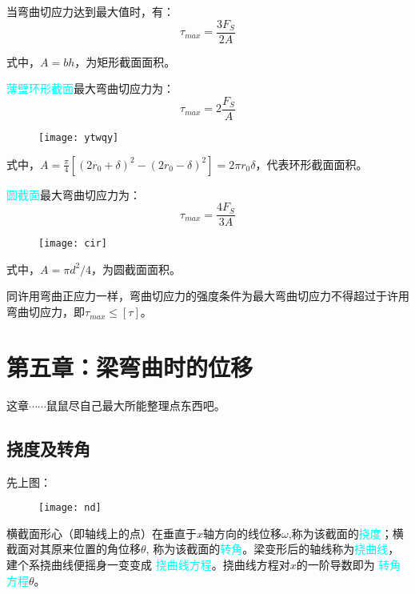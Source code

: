 \documentclass[10pt,a4paper]{ctexart}
\begin{document}
当弯曲切应力达到最大值时，有：
\begin{equation}
	\tau_{max}=\frac{3F_S}{2A}
\end{equation}

式中，$A=bh$，为矩形截面面积。

\textcolor{cyan}{薄壁环形截面}最大弯曲切应力为：
\begin{equation}
		\tau_{max}=2 \frac{F_S}{A}
\end{equation}

\begin{figure}[htp]%
	\centering
	\texttt{[image: ytwqy]}
\end{figure}

式中，$A=\frac{\pi}{4}\left[(2r_0+\delta)^2-(2r_0-\delta)^2\right]=2\pi r_0\delta$，代表环形截面面积。

\textcolor{cyan}{圆截面}最大弯曲切应力为：
\begin{equation}
	\tau_{max}=\frac{4F_S}{3A}
\end{equation}

\begin{figure}[htp]%
	\centering
	\texttt{[image: cir]}
\end{figure}

式中，$A=\pi d^2/4$，为圆截面面积。

同许用弯曲正应力一样，弯曲切应力的强度条件为最大弯曲切应力不得超过于许用弯曲切应力，即$\tau_{max}\leqslant\left[\tau\right]$。

\newpage

\section{第五章：梁弯曲时的位移}
这章$\cdots \cdots$鼠鼠尽自己最大所能整理点东西吧。

\subsection{挠度及转角}
先上图：
\begin{figure}[htp]%
	\centering
	\texttt{[image: nd]}
\end{figure}

横截面形心（即轴线上的点）在垂直于$x$轴方向的线位移$\omega$,称为该截面的\textcolor{cyan}{挠度}；横截面对其原来位置的角位移$\theta$, 称为该截面的\textcolor{cyan}{转角}。梁变形后的轴线称为\textcolor{cyan}{挠曲线}，建个系挠曲线便摇身一变变成
\textcolor{cyan}{挠曲线方程}。挠曲线方程对$x$的一阶导数即为
\textcolor{cyan}{转角方程}$\theta$。
\end{document}
